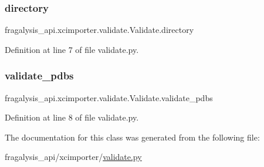 \subsubsection{\texorpdfstring{directory}{directory}}
{\footnotesize\ttfamily fragalysis\+\_\+api.\+xcimporter.\+validate.\+Validate.\+directory}



Definition at line 7 of file validate.\+py.

\mbox{\label{classfragalysis__api_1_1xcimporter_1_1validate_1_1_validate_a73358370d6a752874ee4641f4709eb67}} 
\subsubsection{\texorpdfstring{validate\+\_\+pdbs}{validate\_pdbs}}
{\footnotesize\ttfamily fragalysis\+\_\+api.\+xcimporter.\+validate.\+Validate.\+validate\+\_\+pdbs}



Definition at line 8 of file validate.\+py.



The documentation for this class was generated from the following file\+:\begin{DoxyCompactItemize}
\item 
fragalysis\+\_\+api/xcimporter/\hyperlink{validate_8py}{validate.\+py}\end{DoxyCompactItemize}
